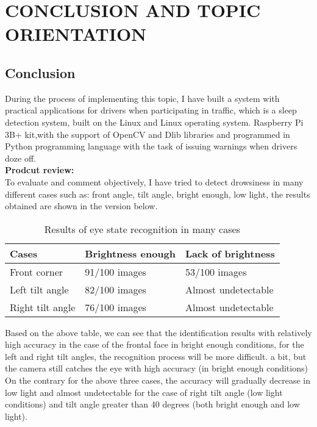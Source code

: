 \chapter{CONCLUSION AND TOPIC ORIENTATION}

\renewcommand{\headrulewidth}{0.5pt}
\renewcommand{\footrulewidth}{0.5pt}
\thispagestyle{plain}
\pagestyle{fancy}
\fancyhf{}
\raggedright
{}

\section{Conclusion}
    During the process of implementing this topic, I have built a system with practical applications for drivers 
    when participating in traffic, which is a sleep detection system, built on the Linux and Linux operating system. 
    Raspberry Pi 3B+ kit,with the support of OpenCV and Dlib libraries and programmed in Python programming language 
    with the task of issuing warnings when drivers doze off. \\ 
    \vspace{3mm}
    \textbf{Prodcut review:} \\ 
    To evaluate and comment objectively, I have tried to detect drowsiness in many different cases such as: front angle, 
    tilt angle, bright enough, low light, the results obtained are shown in the version below. 
    \begin{table}[ht]
        \centering
        \begin{tabular}{| l | l | l |}
            \hline
            \rowcolor{lightgray} Cases & Brightness enough & Lack of brightness \\ \hline
            Front corner & 91/100 images & 53/100 images \\ \hline
            Left tilt angle & 82/100 images & Almost undetectable \\ \hline
            Right tilt angle & 76/100 images & Almost undetectable \\ \hline
        \end{tabular}
        \caption{Results of eye state recognition in many cases}
    \end{table}
    Based on the above table, we can see that the identification results with relatively high accuracy in the case of 
    the frontal face in bright enough conditions, for the left and right tilt angles, the recognition process will be 
    more difficult. a bit, but the camera still catches the eye with high accuracy (in bright enough conditions) \\ 
    \vspace{3mm}
    On the contrary for the above three cases, the accuracy will gradually decrease in low light and almost undetectable 
    for the case of right tilt angle (low light conditions) and tilt angle greater than 40 degrees (both bright enough and low light).

